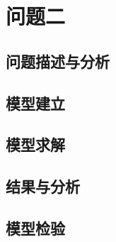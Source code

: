 \section{问题二}
\subsection{问题描述与分析}
\subsection{模型建立}
\subsection{模型求解}
\subsection{结果与分析}
\subsection{模型检验}
